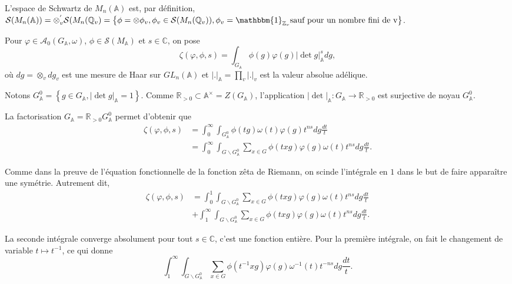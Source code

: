 L'espace de Schwartz de $M_n(\mathbb{A})$ est, par définition, $\mathcal{S}(M_n(\mathbb{A}))=\otimes_v^{'} \mathcal{S}(M_n(\mathbb{Q}_v)=\left\lbrace \phi = \otimes \phi_v, \phi_v \in \mathcal{S}(M_n(\mathbb{Q}_v)), \phi_v = \mathbbm{1}_{\mathbb{Z}_v} \text{sauf pour un nombre fini de v} \right\rbrace$.

Pour $\varphi \in \mathcal{A}_0(G_\mathbb{A}, \omega)$, $\phi \in \mathcal{S}(M_\mathbb{A})$ et $s \in \mathbb{C}$, on pose
\begin{equation}
\zeta(\varphi, \phi, s) = \int_{G_\mathbb{A}} \phi(g) \varphi(g) |\det g|_\mathbb{A}^s dg,
\end{equation}
où $dg = \otimes_v dg_v$ est une mesure de Haar sur $GL_n(\mathbb{A})$ et $|.|_\mathbb{A} = \prod_v |.|_v$ est la valeur absolue adélique.

Notons $G^0_\mathbb{A}=\left\lbrace g \in G_\mathbb{A}, |\det g|_\mathbb{A} = 1 \right\rbrace$. Comme $\mathbb{R}_{> 0} \subset \mathbb{A}^\times=Z(G_\mathbb{A})$, l'application $|\det|_\mathbb{A} : G_\mathbb{A} \rightarrow \mathbb{R}_{> 0}$ est surjective de noyau $G^0_\mathbb{A}$.

La factorisation $G_\mathbb{A} = \mathbb{R}_{> 0}G^0_\mathbb{A}$ permet d'obtenir que
\begin{align}
\zeta(\varphi, \phi, s) &= \int_0^\infty \int_{G^0_\mathbb{A}} \phi(tg) \omega(t) \varphi(g) t^{ns} dg \frac{dt}{t} \\
&= \int_0^\infty \int_{G \backslash G^0_\mathbb{A}} \sum_{x \in G}{\phi(txg)} \varphi(g) \omega(t) t^{ns} dg \frac{dt}{t}.
\end{align}

Comme dans la preuve de l'équation fonctionnelle de la fonction zêta de Riemann, on scinde l'intégrale en $1$ dans le but de faire apparaître une symétrie. Autrement dit,
\begin{equation}
\begin{split}
\zeta(\varphi, \phi, s) &= \int_0^1 \int_{G \backslash G^0_\mathbb{A}} \sum_{x \in G}{\phi(txg)} \varphi(g) \omega(t) t^{ns} dg \frac{dt}{t} \\
&+ \int_1^\infty \int_{G \backslash G^0_\mathbb{A}} \sum_{x \in G}{\phi(txg)} \varphi(g) \omega(t) t^{ns} dg \frac{dt}{t}.
\end{split}
\end{equation}

La seconde intégrale converge absolument pour tout $s \in \mathbb{C}$, c'est une fonction entière. Pour la première intégrale, on fait le changement de variable $t \mapsto t^{-1}$, ce qui donne
\begin{equation}
\int_1^\infty \int_{G \backslash G^0_\mathbb{A}} \sum_{x \in G}{\phi(t^{-1}xg)} \varphi(g) \omega^{-1}(t) t^{-ns} dg \frac{dt}{t}.
\end{equation}

